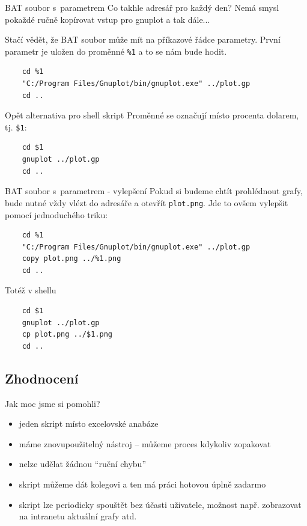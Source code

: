 \documentclass{beamer}
\begin{document}
\begin{frame}[fragile]{BAT soubor s~parametrem}
  Co takhle adresář pro každý den? Nemá smysl pokaždé ručně kopírovat vstup pro gnuplot a tak dále...

  Stačí vědět, že BAT soubor může mít na příkazové řádce parametry. První parametr je uložen do proměnné \texttt{\%1} a to se nám bude hodit.

{\scriptsize
  \begin{verbatim}
    cd %1
    "C:/Program Files/Gnuplot/bin/gnuplot.exe" ../plot.gp
    cd ..
  \end{verbatim}
  }
\end{frame}

\begin{frame}[fragile]{Opět alternativa pro shell skript}
  Proměnné se označují místo procenta dolarem, tj. \texttt{\$1}:

  \begin{verbatim}
    cd $1
    gnuplot ../plot.gp
    cd ..
  \end{verbatim}
\end{frame}

\begin{frame}[fragile]{BAT soubor s~parametrem - vylepšení}
  Pokud si budeme chtít prohlédnout grafy, bude nutné vždy vlézt do adresáře a otevřít \texttt{plot.png}. Jde to ovšem vylepšit pomocí jednoduchého triku:
{\scriptsize
  \begin{verbatim}
    cd %1
    "C:/Program Files/Gnuplot/bin/gnuplot.exe" ../plot.gp
    copy plot.png ../%1.png
    cd ..
  \end{verbatim}
  }
\end{frame}

\begin{frame}[fragile]{Totéž v shellu}
  \begin{verbatim}
    cd $1
    gnuplot ../plot.gp
    cp plot.png ../$1.png
    cd ..
  \end{verbatim}
\end{frame}

\subsection{Zhodnocení}

\begin{frame}{Jak moc jsme si pomohli?}
  \begin{itemize}
    \item jeden skript místo excelovské anabáze
    \item máme znovupoužitelný nástroj -- můžeme proces kdykoliv zopakovat
    \item nelze udělat žádnou ``ruční chybu''
    \item skript můžeme dát kolegovi a ten má práci hotovou úplně zadarmo
    \item skript lze periodicky spouštět bez účasti uživatele, možnost např. zobrazovat na intranetu aktuální grafy atd.
  \end{itemize}
\end{frame}
\end{document}
